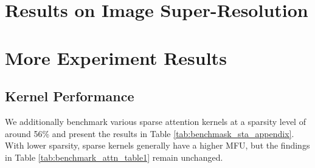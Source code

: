 \section{Results on Image Super-Resolution}
\label{sec:image_hyper_resolution}

\begin{table}[h]
\caption{Image superresolution results with FLUX~\cite{flux2023} on 1000 captions randomly sampled from COCO-2014~\citep{lin2015microsoftcococommonobjects} validation dataset.}
\label{tab:flexattention_scaling}
\end{table}


\section{More Experiment Results}



\subsection{Kernel Performance}
We additionally benchmark various sparse attention kernels at a sparsity level of around 56\% and present the results in Table \ref{tab:benchmask_sta_appendix}. With lower sparsity, sparse kernels generally have a higher MFU, but the findings in Table \ref{tab:benchmark_attn_table1} remain unchanged. 



